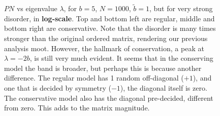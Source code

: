 \documentclass[onecolumn,fleqn,longbibliography]{revtex4}
\begin{document}
\begin{figure}[H]
    \caption{$PN$ vs eigenvalue $\lambda$, for $b=5$, $N=1000$, $\tilde{b}=1$, but for very strong disorder,
    in {\bf log-scale}.
     Top and bottom left are regular, middle and bottom right are conservative. Note that
     the disorder is many times stronger than the original ordered matrix,
     rendering our previous analysis moot. However, the hallmark of
     conservation, a peak at $\lambda=-2b$, is still very much evident. It seems 
     that in the conserving model the band is broader, but perhaps this is
     because another difference. The regular model has 1 random off-diagonal ($+1$),
     and one that is decided by symmetry ($-1$), the diagonal itself is zero. The conservative model also
     has the diagonal pre-decided, different from zero. This adds to the matrix magnitude.}
    \label{fig:cons_strong}
\end{figure}







\end{document}
